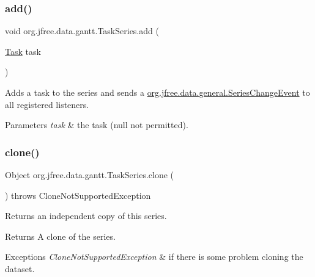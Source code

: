 \subsubsection{\texorpdfstring{add()}{add()}}
{\footnotesize\ttfamily void org.\+jfree.\+data.\+gantt.\+Task\+Series.\+add (\begin{DoxyParamCaption}\item[{\mbox{\hyperlink{classorg_1_1jfree_1_1data_1_1gantt_1_1_task}{Task}}}]{task }\end{DoxyParamCaption})}

Adds a task to the series and sends a \mbox{\hyperlink{classorg_1_1jfree_1_1data_1_1general_1_1_series_change_event}{org.\+jfree.\+data.\+general.\+Series\+Change\+Event}} to all registered listeners.


\begin{DoxyParams}{Parameters}
{\em task} & the task ({\ttfamily null} not permitted). \\
\hline
\end{DoxyParams}
\mbox{\label{classorg_1_1jfree_1_1data_1_1gantt_1_1_task_series_ad43cc33a46ebc7d3cec87d408e2041f3}} 
\subsubsection{\texorpdfstring{clone()}{clone()}}
{\footnotesize\ttfamily Object org.\+jfree.\+data.\+gantt.\+Task\+Series.\+clone (\begin{DoxyParamCaption}{ }\end{DoxyParamCaption}) throws Clone\+Not\+Supported\+Exception}

Returns an independent copy of this series.

\begin{DoxyReturn}{Returns}
A clone of the series.
\end{DoxyReturn}

\begin{DoxyExceptions}{Exceptions}
{\em Clone\+Not\+Supported\+Exception} & if there is some problem cloning the dataset. \\
\hline
\end{DoxyExceptions}
\mbox{\label{classorg_1_1jfree_1_1data_1_1gantt_1_1_task_series_a03ac091eaa08cd9eed725ba44994b098}} 
